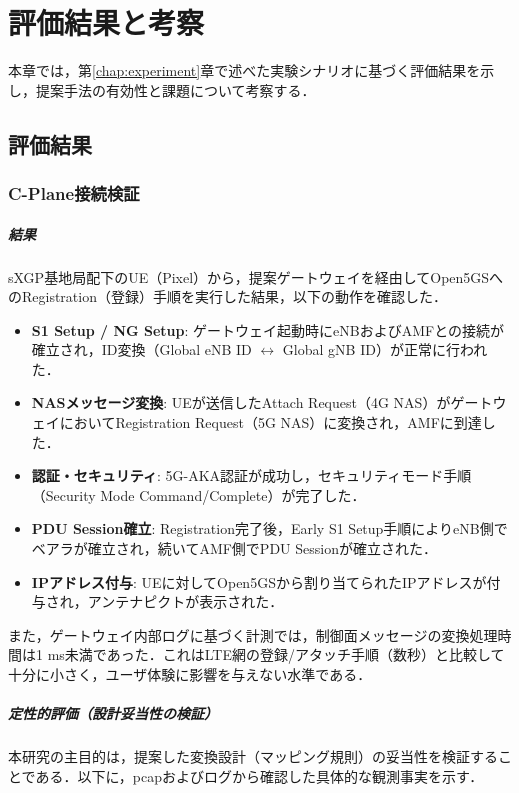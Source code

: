 \chapter{評価結果と考察}
\label{chap:evaluation}

本章では，第\ref{chap:experiment}章で述べた実験シナリオに基づく評価結果を示し，提案手法の有効性と課題について考察する．

\section{評価結果}

\subsection{C-Plane接続検証}
\label{subsec:cplane}
\paragraph{結果}
sXGP基地局配下のUE（Pixel）から，提案ゲートウェイを経由してOpen5GSへのRegistration（登録）手順を実行した結果，以下の動作を確認した．

\begin{itemize}
    \item \textbf{S1 Setup / NG Setup}: ゲートウェイ起動時にeNBおよびAMFとの接続が確立され，ID変換（Global eNB ID $\leftrightarrow$ Global gNB ID）が正常に行われた．
    \item \textbf{NASメッセージ変換}: UEが送信したAttach Request（4G NAS）がゲートウェイにおいてRegistration Request（5G NAS）に変換され，AMFに到達した．
    \item \textbf{認証・セキュリティ}: 5G-AKA認証が成功し，セキュリティモード手順（Security Mode Command/Complete）が完了した．
    \item \textbf{PDU Session確立}: Registration完了後，Early S1 Setup手順によりeNB側でベアラが確立され，続いてAMF側でPDU Sessionが確立された．
    \item \textbf{IPアドレス付与}: UEに対してOpen5GSから割り当てられたIPアドレスが付与され，アンテナピクトが表示された．
\end{itemize}

また，ゲートウェイ内部ログに基づく計測では，制御面メッセージの変換処理時間は1 ms未満であった．これはLTE網の登録/アタッチ手順（数秒）と比較して十分に小さく，ユーザ体験に影響を与えない水準である．

\paragraph{定性的評価（設計妥当性の検証）}
本研究の主目的は，提案した変換設計（マッピング規則）の妥当性を検証することである．以下に，pcapおよびログから確認した具体的な観測事実を示す．

